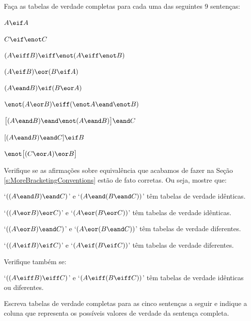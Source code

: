 \practiceproblems\label{pr.TT.TTorC}
\problempart
Faça as tabelas de verdade completas para cada uma das seguintes 9 sentenças:
\begin{earg}\label{pb.A.ttt}
\item $A \eif A$ %
\item $C \eif\enot C$ %
\item $(A \eiff B) \eiff \enot(A\eiff \enot B)$ %
\item $(A \eif B) \eor (B \eif A)$ %
\item $(A \eand B) \eif (B \eor A)$  %
\item $\enot(A \eor B) \eiff (\enot A \eand \enot B)$ %
\item $\bigl[(A\eand B) \eand\enot(A\eand B)\bigr] \eand C$ %
\item $[(A \eand B) \eand C] \eif B$ %
\item $\enot\bigl[(C\eor A) \eor B\bigr]$ %
\end{earg}

\problempart
Verifique se as afirmações sobre equivalência que acabamos de fazer na Seção \ref{s:MoreBracketingConventions} estão de fato corretas.
Ou seja, mostre que:
\begin{earg}
	\item `$((A \eand B) \eand C)$' e `$(A \eand (B \eand C))$' têm tabelas de verdade idênticas.
	\item `$((A \eor B) \eor C)$' e `$(A \eor (B \eor C))$' têm tabelas de verdade idênticas.
	\item `$((A \eor B) \eand C)$' e `$(A \eor (B \eand C))$' têm tabelas de verdade diferentes.
	\item `$((A \eif B) \eif C)$' e `$(A \eif (B \eif C))$' têm tabelas de verdade diferentes.
\end{earg}
Verifique também se:
\begin{earg}
	\item[5.] `$((A \eiff B) \eiff C)$' e `$(A \eiff (B \eiff C))$' têm tabelas de verdade idênticas ou diferentes.
\end{earg}

\problempart
Escreva tabelas de verdade completas para as cinco sentenças a seguir e indique a coluna que representa os possíveis valores de verdade da sentença completa.

